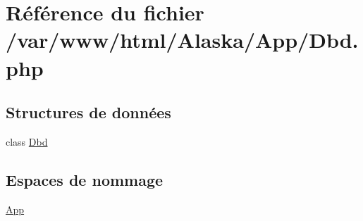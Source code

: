 \hypertarget{_dbd_8php}{}\section{Référence du fichier /var/www/html/\+Alaska/\+App/\+Dbd.php}
\label{_dbd_8php}
\subsection*{Structures de données}
\begin{DoxyCompactItemize}
\item 
class \hyperlink{class_app_1_1_dbd}{Dbd}
\end{DoxyCompactItemize}
\subsection*{Espaces de nommage}
\begin{DoxyCompactItemize}
\item 
 \hyperlink{namespace_app}{App}
\end{DoxyCompactItemize}
